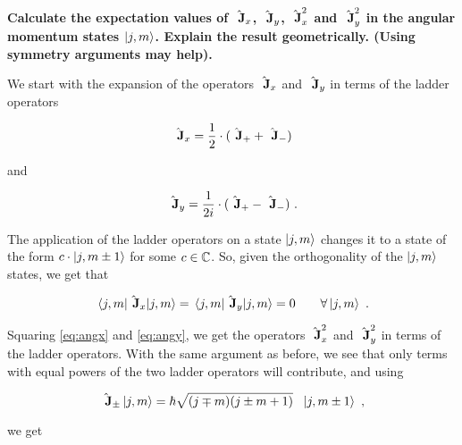 \question


\begin{alphaparts}
    
\questionpart \textbf{Calculate the expectation values of $\hat{\textbf{~J}}_x$, $\hat{\textbf{~J}}_y$,
$\hat{\textbf{~J}}_x ^2$ and $\hat{\textbf{~J}}_y ^2$ in the angular momentum states $\ket{j, m}$. 
Explain the result geometrically. (Using symmetry arguments may help).}

We start with the expansion of the operators $\hat{\textbf{~J}}_x$ and 
$\hat{\textbf{~J}}_y$ in terms of the ladder operators

\begin{equation}
    \hat{\textbf{~J}}_x = \frac{1}{2} \cdot (\hat{\textbf{~J}}_+ + \hat{\textbf{~J}}_-)
    \label{eq:angx}
\end{equation}

and

\begin{equation}
    \hat{\textbf{~J}}_y = \frac{1}{2i} \cdot (\hat{\textbf{~J}}_+ - \hat{\textbf{~J}}_-)~.
    \label{eq:angy}
\end{equation}

The application of the ladder operators on a state $\ket{j, m}$ changes it to a 
state of the form $c\cdot \ket{j, m \pm 1}$ for some $c \in \mathbb{C}$. So, given 
the orthogonality of the $\ket{j, m}$ states, we get that

\begin{equation}
    \expectationvalue{\Angularmomentum_x}{j, m} = \expectationvalue{\Angularmomentum_y}{j, m}  = 0 \qquad\forall \ket{j, m}~.
\end{equation}

Squaring \autoref{eq:angx} and \ref{eq:angy}, we get the operators $\hat{\textbf{~J}}_x ^2$
and $\hat{\textbf{~J}}_y ^2$ in terms of the ladder operators. With the same argument as before,
we see that only terms with equal powers of the two ladder operators will contribute, and using

\begin{equation}
    \hat{\textbf{~J}}_{\pm}\ket{j, m} = \hbar \sqrt{(j \mp m)(j \pm m + 1)} ~~\ket{j, m \pm 1} ~, 
\end{equation}

we get 



\end{alphaparts}
